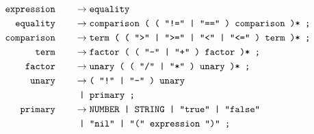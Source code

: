 \documentclass[12pt, a4paper]{article}
\newcommand{\ttt}[1]{
    \text{\texttt{#1}}
}
\newcommand{\ebnfnode}[2]{%
    #1\hspace{20px} &\to #2\\
}
\newcommand{\ebnfnodett}[2]{%
    \ebnfnode{\ttt{#1}}{\ttt{#2}}
}
\begin{document}
    \begin{align*}
        \ebnfnodett{expression}{equality}
        \ebnfnodett{equality}{comparison ( ( "!=" | "==" ) comparison )* ;}
        \ebnfnodett{comparison}{term ( ( ">" | ">=" | "<" | "<=" ) term )* ;}
        \ebnfnodett{term}{factor ( ( "-" | "+" ) factor )* ;}
        \ebnfnodett{factor}{unary ( ( "/" | "*" ) unary )* ;}
        \ebnfnode{\ttt{unary}}{\ttt{( "!" | "-" ) unary}\\&\ttt{ | primary ;}}
        \ebnfnode{\ttt{primary}}{\ttt{NUMBER | STRING | "true" | "false"}\\&\ttt{ | "nil" | "(" expression ")" ;}}
    \end{align*}
\end{document}
